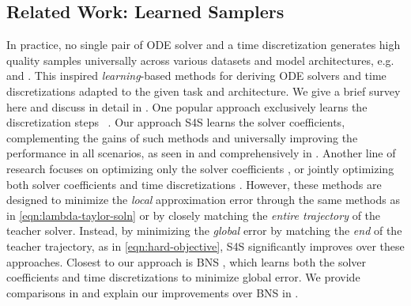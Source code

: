 \subsection{Related Work: Learned Samplers} 
In practice, no single pair of ODE solver and a time discretization generates high quality samples universally across various datasets and model architectures, e.g.  and \citet{tong2024learning}.
This inspired {\em learning}-based methods for deriving ODE solvers and time discretizations adapted to the given task and architecture.
We give a brief survey here and discuss in detail in . 
One popular approach exclusively learns the discretization steps ~\cite{watson2021learning,sabour2024align,xue2024accelerating,tong2024learning,pmlr-v235-chen24bm}. 
Our approach S4S learns the solver coefficients, complementing the gains of such methods and universally improving the performance in all scenarios, as seen in  and comprehensively in .
Another line of research focuses on optimizing only the solver coefficients \cite{zheng2023dpm,zhang2023accelerating}, or jointly optimizing both solver coefficients and time discretizations \cite{zhou2024fast,zheng2023dpm,liu2023unified,shaul2023bespoke}.  
However, these methods are designed to minimize the {\em local} approximation error through the same methods as in \eqref{eqn:lambda-taylor-soln} or by closely matching the \emph{entire trajectory} of the teacher solver.
Instead, by minimizing the \emph{global} error by matching the \emph{end} of the teacher trajectory, as in \eqref{eqn:hard-objective}, S4S significantly improves over these approaches.
Closest to our approach is BNS \cite{shaul2024bespoke}, which learns both the solver coefficients and time discretizations to minimize global error.
We provide comparisons in  and explain our improvements over BNS in .
